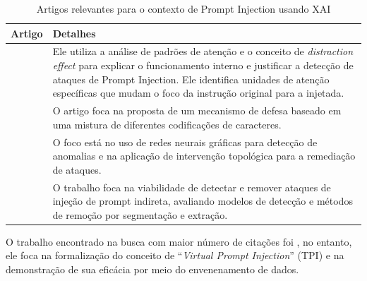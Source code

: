 \begin{table}[ht!]
    \centering
    \small
    \caption{Artigos relevantes para o contexto de Prompt Injection usando XAI}
    \begin{tabularx}{\linewidth}{p{6cm} X}
        \toprule
        \textbf{Artigo} & \textbf{Detalhes} \\
        \midrule
        
        \textcite{hung2025attention} & Ele utiliza a análise de padrões de atenção e o conceito de \textit{distraction effect} para explicar o funcionamento interno e justificar a detecção de ataques de Prompt Injection. Ele identifica unidades de atenção específicas que mudam o foco da instrução original para a injetada. \\

        \textcite{zhang2025defense} & O artigo foca na proposta de um mecanismo de defesa baseado em uma mistura de diferentes codificações de caracteres. \\

        \textcite{wang2025g} & O foco está no uso de redes neurais gráficas para detecção de anomalias e na aplicação de intervenção topológica para a remediação de ataques. \\

        \textcite{chen2025can} & O trabalho foca na viabilidade de detectar e remover ataques de injeção de prompt indireta, avaliando modelos de detecção e métodos de remoção por segmentação e extração. \\
        
        \bottomrule
    \end{tabularx}
    \label{tab:acl-pi}
\end{table}

O trabalho encontrado na busca com maior número de citações foi \textcite{yan2024backdooring}, no entanto, ele foca na formalização do conceito de ``\textit{Virtual Prompt Injection}'' (TPI) e na demonstração de sua eficácia por meio do envenenamento de dados.
